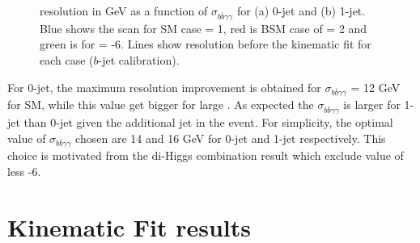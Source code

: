 \begin{figure}[htbp]
   \centering
   \begin{tcolorbox}[colback=black!5!white,colframe=white!75!black]
   \caption{\mbb resolution in GeV as a function of $\sigma_{b\bar{b}\gamma\gamma}$ for (a) 0-jet and (b) 1-jet. Blue shows the scan for SM case \kl = 1, red is BSM case of \kl = 2 and green is for \kl = -6. Lines show \mbb resolution before the kinematic fit for each case ($b$-jet calibration).}
   \label{fig:Adx4:Scan}
   \end{tcolorbox}
   
\end{figure}

For 0-jet, the maximum \mbb resolution improvement is obtained for $\sigma_{b\bar{b}\gamma\gamma}$ = 12 GeV for SM, while this value get bigger for large \kl. As expected the $\sigma_{b\bar{b}\gamma\gamma}$ is larger for 1-jet than 0-jet given the additional jet in the event. For simplicity, the optimal value of $\sigma_{b\bar{b}\gamma\gamma}$ chosen are 14 and 16 GeV for 0-jet and 1-jet respectively. This choice is motivated from the di-Higgs combination result which exclude value of \kl less -6.  

\section{Kinematic Fit results}

